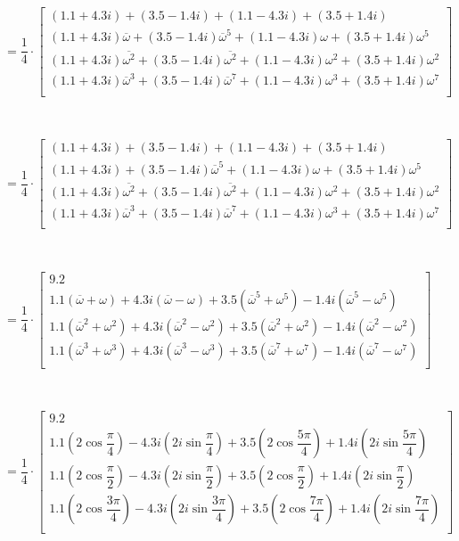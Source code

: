 $ $

$= \dfrac{1}{4} \cdot
\begin{bmatrix} 
(1.1 + 4.3i) + (3.5 - 1.4i) + (1.1 - 4.3i) + (3.5 + 1.4i)\\
(1.1 + 4.3i)\overline{\omega} + (3.5 - 1.4i)\overline{\omega}^5 + (1.1 - 4.3i)\omega+ (3.5 + 1.4i)\omega^5 \\
(1.1 + 4.3i)\overline{\omega^2} + (3.5 - 1.4i)\overline{\omega^2} + (1.1 - 4.3i)\omega^2+ (3.5 + 1.4i)\omega^2 \\
(1.1 + 4.3i)\overline{\omega}^3 + (3.5 - 1.4i)\overline{\omega}^7 + (1.1 - 4.3i)\omega^3 + (3.5 + 1.4i)\omega^7 \\
\end{bmatrix}$

$ $

$= \dfrac{1}{4} \cdot
\begin{bmatrix} 
(1.1 + 4.3i) + (3.5 - 1.4i) + (1.1 - 4.3i) + (3.5 + 1.4i)\\
(1.1 + 4.3i) + (3.5 - 1.4i)\overline{\omega}^5 + (1.1 - 4.3i)\omega+ (3.5 + 1.4i)\omega^5 \\
(1.1 + 4.3i)\overline{\omega^2} + (3.5 - 1.4i)\overline{\omega^2} + (1.1 - 4.3i)\omega^2+ (3.5 + 1.4i)\omega^2 \\
(1.1 + 4.3i)\overline{\omega}^3 + (3.5 - 1.4i)\overline{\omega}^7 + (1.1 - 4.3i)\omega^3 + (3.5 + 1.4i)\omega^7 \\
\end{bmatrix}$

$ $

$= \dfrac{1}{4} \cdot
\begin{bmatrix} 
9.2\\
1.1(\overline{\omega} + \omega) + 4.3i(\overline{\omega} - \omega) +
3.5(\overline{\omega}^5 + \omega^5) - 1.4i(\overline{\omega}^5 - \omega^5)\\
1.1(\overline{\omega}^2 + {\omega}^2) + 4.3i(\overline{\omega}^2 - {\omega}^2) +
3.5(\overline{\omega}^2 + {\omega}^2) - 1.4i(\overline{\omega}^2 - {\omega}^2)\\
1.1(\overline{\omega}^3 + {\omega}^3) + 4.3i(\overline{\omega}^3 - {\omega}^3) +
3.5(\overline{\omega}^7 + {\omega}^7) - 1.4i(\overline{\omega}^7 - {\omega}^7)\\
\end{bmatrix}$

$ $

$= \dfrac{1}{4} \cdot
\begin{bmatrix} 
9.2\\
1.1\left(2\cos\dfrac{\pi}{4}\right) - 4.3i\left(2i\sin\dfrac{\pi}{4}\right) + 3.5\left(2\cos\dfrac{5\pi}{4}\right) + 1.4i\left(2i\sin\dfrac{5\pi}{4}\right)\\
1.1\left(2\cos\dfrac{\pi}{2}\right) - 4.3i\left(2i\sin\dfrac{\pi}{2}\right) + 3.5\left(2\cos\dfrac{\pi}{2}\right) + 1.4i\left(2i\sin\dfrac{\pi}{2}\right)\\
1.1\left(2\cos\dfrac{3\pi}{4}\right) - 4.3i\left(2i\sin\dfrac{3\pi}{4}\right) + 3.5 \left(2\cos\dfrac{7\pi}{4}\right) + 1.4i\left(2i\sin\dfrac{7\pi}{4}\right)\\
\end{bmatrix}$

